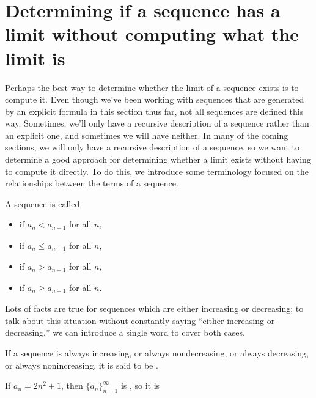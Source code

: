 \documentclass{ximera}
\begin{document}
\section{Determining if a sequence has a limit without computing what the limit is}

Perhaps the best way to determine whether the limit of a sequence exists is to compute it.  Even though we've been working with sequences that are generated by an explicit formula in this section thus far, not all sequences are defined this way.  Sometimes, we'll only have a recursive description of a sequence rather than an explicit one, and sometimes we will have neither.  In many of the coming sections, we will only have a recursive description of a sequence, so we want to determine a good approach for determining whether a limit exists without having to compute it directly.  To do this, we introduce some terminology focused on the relationships between the terms of a sequence.

\begin{definition}
  A sequence is called
  \begin{itemize}
    \item {} if $a_n<a_{n+1}$ for all $n$,
    \item {} if $a_n\le a_{n+1}$ for all $n$,
    \item {} if $a_n>a_{n+1}$ for all $n$,
    \item {} if $a_n\ge a_{n+1}$ for all $n$.
  \end{itemize}
\end{definition}

Lots of facts are true for sequences which are either increasing or
decreasing; to talk about this situation without constantly saying
``either increasing or decreasing,'' we can introduce a single word to
cover both cases.
\begin{definition}
  If a sequence is always increasing, or  always nondecreasing, or always decreasing, or always nonincreasing, it is said to be .
\end{definition}


\begin{example}
If $a_n = 2n^2+1$, then $\{a_n\}_{n=1}^{\infty}$ is , so it is
\end{example}
\end{document}
